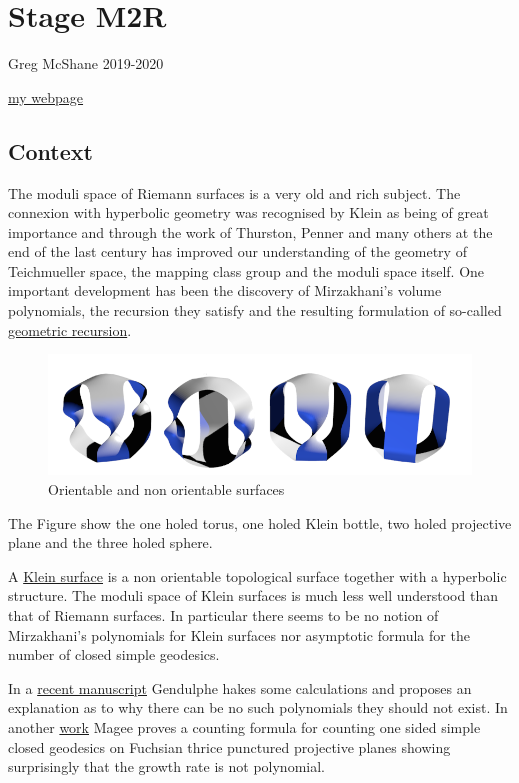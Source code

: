 \documentclass[
]{article}
\author{}
\date{}
\begin{document}
\hypertarget{stage-m2r}{%
\section{Stage M2R}\label{stage-m2r}}

Greg McShane 2019-2020

\href{https://macbuse.github.io/}{my webpage}

\hypertarget{context}{%
\subsection{Context}\label{context}}

The moduli space of Riemann surfaces is a very old and rich subject. The
connexion with hyperbolic geometry was recognised by Klein as being of
great importance and through the work of Thurston, Penner and many
others at the end of the last century has improved our understanding of
the geometry of Teichmueller space, the mapping class group and the
moduli space itself. One important development has been the discovery of
Mirzakhani's volume polynomials, the recursion they satisfy and the
resulting formulation of so-called
\href{https://arxiv.org/abs/1711.04729}{geometric recursion}.

\begin{figure}
\centering
\includegraphics{./4surfaces.png}
\caption{Orientable and non orientable surfaces}
\end{figure}

The Figure show the one holed torus, one holed Klein bottle, two holed
projective plane and the three holed sphere.

A \href{https://en.wikipedia.org/wiki/Klein_surface}{Klein surface} is a
non orientable topological surface together with a hyperbolic structure.
The moduli space of Klein surfaces is much less well understood than
that of Riemann surfaces. In particular there seems to be no notion of
Mirzakhani's polynomials for Klein surfaces nor asymptotic formula for
the number of closed simple geodesics.

In a \href{https://arxiv.org/abs/1706.08798}{recent manuscript}
Gendulphe hakes some calculations and proposes an explanation as to why
there can be no such polynomials they should not exist. In another
\href{https://arxiv.org/abs/1705.09377}{work} Magee proves a counting
formula for counting one sided simple closed geodesics on Fuchsian
thrice punctured projective planes showing surprisingly that the growth
rate is not polynomial.
\end{document}
